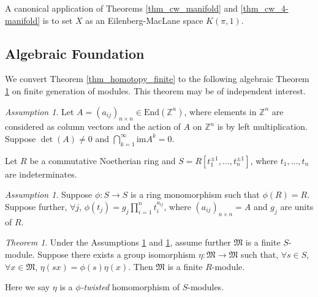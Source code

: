 \documentclass[12pt]{amsart}
\theoremstyle{plain}
\theoremstyle{definition}
\theoremstyle{question}
\theoremstyle{remark}
\theoremstyle{assumption}
\newtheorem{assumption}[theorem]{Assumption}
\numberwithin{equation}{section}
\theoremstyle{bigthm}
\newtheorem{bigthm}{Theorem}
\begin{document}
A canonical application of Theorems \ref{thm_cw_manifold} and \ref{thm_cw_4-manifold} is to set $X$ as an Eilenberg-MacLane space $K(\pi, 1)$.

\subsection{Algebraic Foundation}
We convert Theorem \ref{thm_homotopy_finite} to the following algebraic Theorem \ref{thm_finite_module} on finite generation of modules. This theorem may be of independent interest.
\begin{assumption}\label{asm_matrix}
Let $A=(a_{ij})_{n \times n} \in \mathrm{End} (\mathbb{Z}^{n})$, where elements in $\mathbb{Z}^{n}$ are considered as column vectors and the action of $A$ on $\mathbb{Z}^{n}$ is by left multiplication. Suppose $\det (A) \neq 0$ and $\bigcap_{k=1}^{\infty} \mathrm{im} A^{k} =0$.
\end{assumption}

Let $R$ be a commutative Noetherian ring and $S= R[t_{1}^{\pm 1}, \dots, t_{n}^{\pm 1}]$, where $t_{1}, \dots, t_{n}$ are indeterminates.

\begin{assumption}\label{asm_ring_hom}
Suppose $\phi \colon  S \rightarrow S$ is a ring monomorphism such that $\phi (R) =R$. Suppose further, $\forall j$, $\phi(t_{j}) = g_{j} \prod_{i=1}^{n} t_{i}^{a_{ij}}$, where $(a_{ij})_{n \times n} = A$ and $g_{j}$ are units of $R$.
\end{assumption}

\begin{bigthm}\label{thm_finite_module}
Under the Assumptions \ref{asm_matrix} and \ref{asm_ring_hom}, assume further $\mathfrak{M}$ is a finite $S$-module. Suppose there exists a group isomorphism $\eta \colon  \mathfrak{M} \rightarrow \mathfrak{M}$ such that, $\forall s \in S$, $\forall x \in \mathfrak{M}$, $\eta (sx) = \phi (s) \eta (x)$. Then $\mathfrak{M}$ is a finite $R$-module.
\end{bigthm}

Here we say $\eta$ is a \textit{$\phi$-twisted} homomorphism of $S$-modules.

\end{document}
